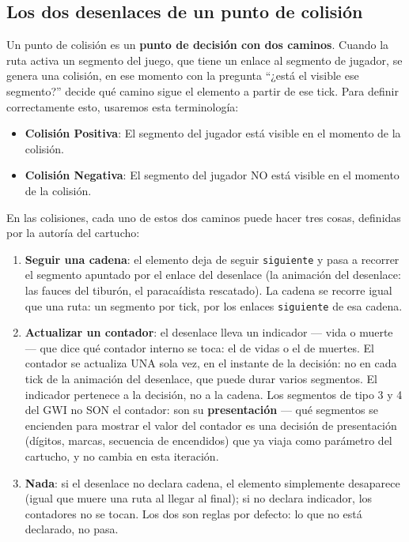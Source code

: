 \subsection{Los dos desenlaces de un punto de colisión}

Un punto de colisión es un \textbf{punto de decisión con dos caminos}.
Cuando la ruta activa un segmento del juego, que tiene un enlace al 
segmento de jugador, se genera una colisión, en ese momento con la 
pregunta ``¿está el visible ese segmento?'' decide qué camino sigue el
elemento a partir de ese tick. Para definir correctamente esto, usaremos esta terminología:
\begin{itemize}
	\item \textbf{Colisión Positiva}: El segmento del jugador está visible en el momento de la colisión.
	\item \textbf{Colisión Negativa}: El segmento del jugador NO está visible en el momento de la colisión.
\end{itemize}

En las colisiones, cada uno de estos dos caminos puede hacer tres cosas, 
definidas por la autoría del cartucho:

\begin{enumerate}
	\item \textbf{Seguir una cadena}: el elemento deja de seguir
	\texttt{siguiente} y pasa a recorrer el segmento apuntado por el
	enlace del desenlace (la animación del desenlace: las fauces del
	tiburón, el paracaídista rescatado). La cadena se recorre igual
	que una ruta: un segmento por tick, por los enlaces
	\texttt{siguiente} de esa cadena.
	
	\item \textbf{Actualizar un contador}: el desenlace lleva un indicador — vida o muerte — que dice qué contador interno se toca: el de vidas o el de muertes. El contador se actualiza UNA sola vez, en el instante de la decisión: no en cada tick de la animación del desenlace, que puede durar varios segmentos. El indicador pertenece a la decisión, no a la cadena. Los segmentos de tipo 3 y 4 del GWI no SON el contador: son su \textbf{presentación} — qué segmentos se encienden para mostrar el valor del contador es una decisión de presentación (dígitos, marcas, secuencia de encendidos) que ya viaja como parámetro del cartucho, y no cambia en esta iteración.
	
	\item \textbf{Nada}: si el desenlace no declara cadena, el
	elemento simplemente desaparece (igual que muere una ruta al
	llegar al final); si no declara indicador, los contadores no se
	tocan. Los dos son reglas por defecto: lo que no está declarado,
	no pasa.
\end{enumerate}

